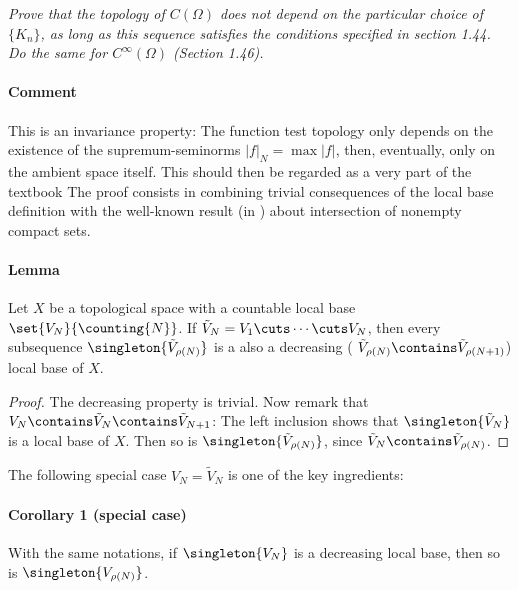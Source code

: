 \textit{
Prove that the topology of $C(\Omega)$ does not depend on the particular 
choice of $\{K_{n}\}$, as long as this sequence satisfies the conditions 
specified in section 1.44. Do the same for $C^\infty(\Omega)$ (Section 1.46).}
%
\paragraph{Comment}This is an invariance property: 
The function test topology only depends on the existence of the 
supremum-seminorms $|f|_N = \max{|f|}$, then, eventually, 
only on the ambient space itself. 
This should then be regarded as a very part of the textbook \cite{FA}
%
The proof consists in combining trivial consequences of the local base 
definition with the well-known result (\eg [2.6] in \cite{BigRudin}) 
about intersection of nonempty compact sets. 

\paragraph{Lemma} Let $X$ be a topological space with a countable local base 
$\set{V_N}{\counting{N}}$. 
If 
%
  $\tilde{V}_{N} = V_1 \cuts \cdots \cuts V_N$, 
%
then every subsequence 
% 
  $\singleton{\tilde{V}_{\rho(N)}}$ 
%
is a also a {decreasing} (\ie 
%
  $\tilde{V}_{\rho(N)} \contains \tilde{V}_{\rho(N+1)}$)
%
local base of $X$.
%
\begin{proof}
The decreasing property is trivial. Now remark that 
%
  $V_N \contains \tilde{V}_{N} \contains \tilde{V}_{N+1}$:
%
The left inclusion shows that 
%
  $\singleton{\tilde{V}_{N}}$ 
% 
is a local base of $X$. Then so is 
%
  $\singleton{\tilde{V}_{\rho(N)}}$,
% 
since $\tilde{V}_{N} \contains \tilde{V}_{\rho(N)}$.
\end{proof}
%
The following special case 
%
  $V_{N} = \tilde{V}_{N}$ 
% 
is one of the key ingredients:
\paragraph{Corollary 1 (special case)}
With the same notations, if $\singleton{V_{N}}$ is a decreasing local base, 
then so is $\singleton{V_{\rho(N)}}$.
%
